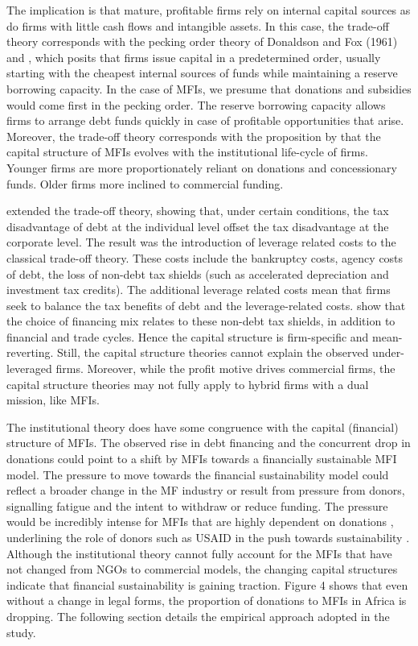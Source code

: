 \documentclass[a4paper,nobind]{templates/ociamthesis}
\begin{document}
The implication is that mature, profitable firms rely on internal capital sources as do firms with little cash flows and intangible assets. In this case, the trade-off theory corresponds with the pecking order theory of Donaldson and Fox (1961) and \textcite{myers1984corporate}, which posits that firms issue capital in a predetermined order, usually starting with the cheapest internal sources of funds while maintaining a reserve borrowing capacity. In the case of MFIs, we presume that donations and subsidies would come first in the pecking order. The reserve borrowing capacity allows firms to arrange debt funds quickly in case of profitable opportunities that arise. Moreover, the trade-off theory corresponds with the proposition by \textcite{bayai2016financing} that the capital structure of MFIs evolves with the institutional life-cycle of firms. Younger firms are more proportionately reliant on donations and concessionary funds. Older firms more inclined to commercial funding.

\textcite{bradley1984existence} extended the trade-off theory, showing that, under certain conditions, the tax disadvantage of debt at the individual level offset the tax disadvantage at the corporate level. The result was the introduction of leverage related costs to the classical trade-off theory. These costs include the bankruptcy costs, agency costs of debt, the loss of non-debt tax shields (such as accelerated depreciation and investment tax credits). The additional leverage related costs mean that firms seek to balance the tax benefits of debt and the leverage-related costs. \textcite{miao2005optimal} show that the choice of financing mix relates to these non-debt tax shields, in addition to financial and trade cycles. Hence the capital structure is firm-specific and mean-reverting. Still, the capital structure theories cannot explain the observed under-leveraged firms. Moreover, while the profit motive drives commercial firms, the capital structure theories may not fully apply to hybrid firms with a dual mission, like MFIs.

The institutional theory does have some congruence with the capital (financial) structure of MFIs. The observed rise in debt financing and the concurrent drop in donations could point to a shift by MFIs towards a financially sustainable MFI model. The pressure to move towards the financial sustainability model could reflect a broader change in the MF industry or result from pressure from donors, signalling fatigue and the intent to withdraw or reduce funding. The pressure would be incredibly intense for MFIs that are highly dependent on donations \autocite{powell2012new}, underlining the role of donors such as USAID in the push towards sustainability \autocite{bateman2010doesn}. Although the institutional theory cannot fully account for the MFIs that have not changed from NGOs to commercial models, the changing capital structures indicate that financial sustainability is gaining traction. Figure 4 shows that even without a change in legal forms, the proportion of donations to MFIs in Africa is dropping. The following section details the empirical approach adopted in the study.
\end{document}
